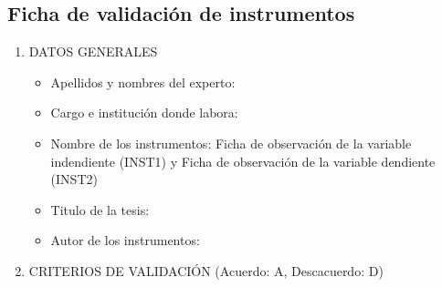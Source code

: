 \documentclass[12pt,a4paper]{article}
\begin{document}
\subsection{Ficha de validación de instrumentos}
\begin{enumerate}
	\item DATOS GENERALES
	      \begin{itemize}
		      \item Apellidos y nombres del experto: \dotfill
		      \item Cargo e institución donde labora: \dotfill
		      \item Nombre de los instrumentos: Ficha de observación de la  variable indendiente (INST1) y Ficha de observación de la  variable dendiente (INST2)
		      \item Titulo de la tesis: \titulo
		      \item Autor de los instrumentos: \autor
	      \end{itemize}

	\item CRITERIOS DE VALIDACIÓN (Acuerdo: A, Descacuerdo: D)


\end{enumerate}
\end{document}
